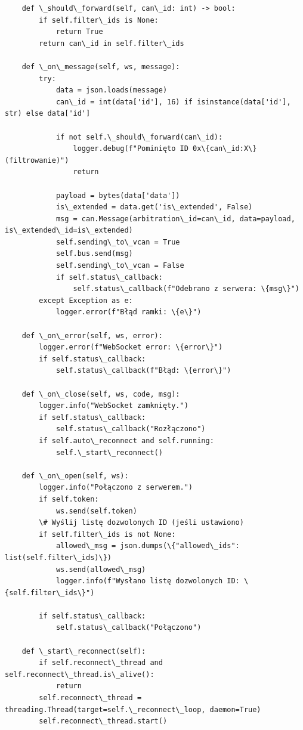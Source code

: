 \begin{lstlisting}
    def \_should\_forward(self, can\_id: int) -> bool:
        if self.filter\_ids is None:
            return True
        return can\_id in self.filter\_ids

    def \_on\_message(self, ws, message):
        try:
            data = json.loads(message)
            can\_id = int(data['id'], 16) if isinstance(data['id'], str) else data['id']

            if not self.\_should\_forward(can\_id):
                logger.debug(f"Pominięto ID 0x\{can\_id:X\} (filtrowanie)")
                return

            payload = bytes(data['data'])
            is\_extended = data.get('is\_extended', False)
            msg = can.Message(arbitration\_id=can\_id, data=payload, is\_extended\_id=is\_extended)
            self.sending\_to\_vcan = True
            self.bus.send(msg)
            self.sending\_to\_vcan = False
            if self.status\_callback:
                self.status\_callback(f"Odebrano z serwera: \{msg\}")
        except Exception as e:
            logger.error(f"Błąd ramki: \{e\}")

    def \_on\_error(self, ws, error):
        logger.error(f"WebSocket error: \{error\}")
        if self.status\_callback:
            self.status\_callback(f"Błąd: \{error\}")

    def \_on\_close(self, ws, code, msg):
        logger.info("WebSocket zamknięty.")
        if self.status\_callback:
            self.status\_callback("Rozłączono")
        if self.auto\_reconnect and self.running:
            self.\_start\_reconnect()

    def \_on\_open(self, ws):
        logger.info("Połączono z serwerem.")
        if self.token:
            ws.send(self.token)
        \# Wyślij listę dozwolonych ID (jeśli ustawiono)
        if self.filter\_ids is not None:
            allowed\_msg = json.dumps(\{"allowed\_ids": list(self.filter\_ids)\})
            ws.send(allowed\_msg)
            logger.info(f"Wysłano listę dozwolonych ID: \{self.filter\_ids\}")

        if self.status\_callback:
            self.status\_callback("Połączono")

    def \_start\_reconnect(self):
        if self.reconnect\_thread and self.reconnect\_thread.is\_alive():
            return
        self.reconnect\_thread = threading.Thread(target=self.\_reconnect\_loop, daemon=True)
        self.reconnect\_thread.start()


\end{lstlisting}

